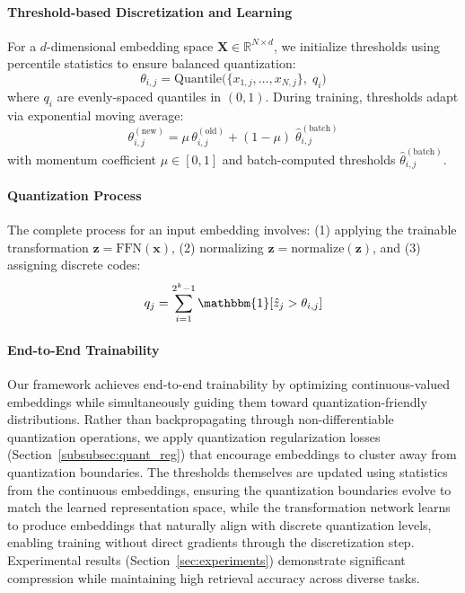 \paragraph{Threshold-based Discretization and Learning}
For a $d$-dimensional embedding space $\mathbf{X} \in \mathbb{R}^{N \times d}$, we initialize thresholds using percentile statistics to ensure balanced quantization:
\begin{equation}
    \theta_{i,j} = \text{Quantile}\bigl(\{x_{1,j}, \ldots, x_{N,j}\},\; q_i\bigr)
\end{equation}
where $q_i$ are evenly-spaced quantiles in $(0,1)$. During training, thresholds adapt via exponential moving average:
\begin{equation}
    \theta_{i,j}^{(\text{new})} = \mu\,\theta_{i,j}^{(\text{old})} + (1-\mu)\;\widehat{\theta}_{i,j}^{(\text{batch})}
\end{equation}
with momentum coefficient $\mu \in [0,1]$ and batch-computed thresholds $\widehat{\theta}_{i,j}^{(\text{batch})}$.

\paragraph{Quantization Process}
The complete process for an input embedding involves: (1) applying the trainable transformation $\mathbf{z} = \text{FFN}(\mathbf{x})$, (2) normalizing $\hat{\mathbf{z}} = \text{normalize}(\mathbf{z})$, and (3) assigning discrete codes:
\begin{equation}
    q_j = \sum_{i=1}^{2^k-1} \mathbbm{1}[\hat{z}_j > \theta_{i,j}]
\end{equation}

\paragraph{End-to-End Trainability}
Our framework achieves end-to-end trainability by optimizing continuous-valued embeddings while simultaneously guiding them toward quantization-friendly distributions. Rather than backpropagating through non-differentiable quantization operations, we apply quantization regularization losses (Section~\ref{subsubsec:quant_reg}) that encourage embeddings to cluster away from quantization boundaries. 
The thresholds themselves are updated using statistics from the continuous embeddings, ensuring the quantization boundaries evolve to match the learned representation space, while the transformation network learns to produce embeddings that naturally align with discrete quantization levels, enabling training without direct gradients through the discretization step.
Experimental results (Section~\ref{sec:experiments}) demonstrate significant compression while maintaining high retrieval accuracy across diverse tasks.







